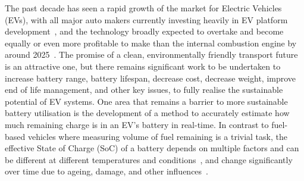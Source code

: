 %
%
The past decade has seen a rapid growth of the market for Electric Vehicles (EVs), with all major auto makers currently investing heavily in EV platform development~\cite{iea_global_2023}, and the technology broadly expected to overtake and become equally or even more profitable to make than the internal combustion engine by around 2025~\cite{baik_making_2019}.
The promise of a clean, environmentally friendly transport future is an attractive one, but there remains significant work to be undertaken to increase battery range, battery lifespan, decrease cost, decrease weight, improve end of life management, and other key issues, to fully realise the sustainable potential of EV systems.
One area that remains a barrier to more sustainable battery utilisation is the development of a method to accurately estimate how much remaining charge is in an EV's battery in real-time.
In contrast to fuel-based vehicles where measuring volume of fuel remaining is a trivial task, the effective State of Charge (SoC) of a battery depends on multiple factors and can be different at different temperatures and conditions~\cite{xing_state_2014}, and change significantly over time due to ageing, damage, and other influences~\cite{johansson_neural_2018}.

